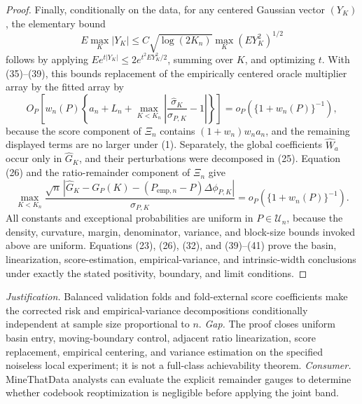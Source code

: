 \documentclass{article}
\begin{document}
\begin{proof}
Finally, conditionally on the data, for any centered Gaussian vector \((Y_K)\), the elementary bound
\[
 E\max_K|Y_K|\leq C\sqrt{\log(2K_n)}\max_K(EY_K^2)^{1/2}
\]
follows by applying \(Ee^{t|Y_K|}\leq2e^{t^2EY_K^2/2}\), summing over \(K\), and optimizing \(t\).  With (35)--(39), this bounds replacement of the empirically centered oracle multiplier array by the fitted array by
\[
 O_P\!\left[w_n(P)\left\{a_n+L_n+
 \max_{K<K_n}\left|\frac{\widehat\sigma_K}{\sigma_{P,K}}-1\right|\right\}\right]
 =o_P\!\left(\{1+w_n(P)\}^{-1}\right),                                    \tag{40}
\]
because the score component of \(\Xi_n\) contains \((1+w_n)w_na_n\), and the remaining displayed terms are no larger under (1).  Separately, the global coefficients \(\widehat W_a\) occur only in \(\widehat G_K\), and their perturbations were decomposed in (25).  Equation (26) and the ratio-remainder component of \(\Xi_n\) give
\[
 \max_{K<K_n}
 \frac{\sqrt n\,|\widehat G_K-G_P(K)-(P_{\mathrm{emp},n}-P)\Delta\phi_{P,K}|}
 {\sigma_{P,K}}
 =o_P\!\left(\{1+w_n(P)\}^{-1}\right).                                    \tag{41}
\]
All constants and exceptional probabilities are uniform in \(P\in\mathcal U_n\), because the density, curvature, margin, denominator, variance, and block-size bounds invoked above are uniform.  Equations (23), (26), (32), and (39)--(41) prove the basin, linearization, score-estimation, empirical-variance, and intrinsic-width conclusions under exactly the stated positivity, boundary, and limit conditions.
\end{proof}
\par\smallskip\noindent \textit{Justification.} Balanced validation folds and fold-external score coefficients make the corrected risk and empirical-variance decompositions conditionally independent at sample size proportional to \(n\). \textit{Gap.} The proof closes uniform basin entry, moving-boundary control, adjacent ratio linearization, score replacement, empirical centering, and variance estimation on the specified noiseless local experiment; it is not a full-class achievability theorem. \textit{Consumer.} MineThatData analysts can evaluate the explicit remainder gauges to determine whether codebook reoptimization is negligible before applying the joint band.
\end{document}
